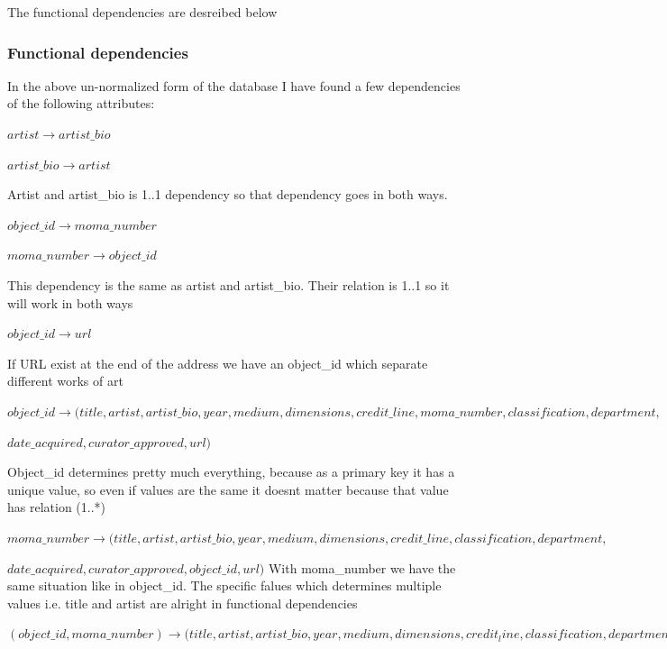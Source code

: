 \documentclass[journal,transmag]{IEEEtran}
\begin{document}
The functional dependencies are desreibed below
\newline


\subsubsection {Functional dependencies}

In the above un-normalized form of the database I have found a few dependencies of the following  attributes:
 
$artist \rightarrow artist\_bio$

$artist\_bio \rightarrow artist$

Artist and artist\_bio is 1..1 dependency so that dependency goes in both ways.
\newline


$object\_id \rightarrow moma\_number$

$moma\_number \rightarrow object\_id$

This dependency is the same as artist and artist\_bio. Their relation is 1..1 so it will work in both ways
\newline


$object\_id \rightarrow url$

If URL exist at the end of the address we have an object\_id which separate different works of art
\newline

$object\_id \rightarrow (title, artist, artist\_bio, year, medium, dimensions, credit\_line, moma\_number, classification, department,$

$date\_acquired, curator\_approved, url)$

Object\_id determines pretty much everything, because as a primary key it has a unique value, so even if values are the same it doesnt matter because that value has relation (1..*) 
\newline

$moma\_number \rightarrow (title, artist, artist\_bio, year, medium, dimensions, credit\_line, classification, department,$ 

$date\_acquired, curator\_approved, object\_id, url)$
With moma\_number we have the same situation like in object\_id. The specific falues which determines multiple values i.e. title and artist are alright in functional dependencies
\newline

$(object\_id, moma\_number) \rightarrow (title, artist, artist\_bio, year, medium, dimensions, credit_line, classification, department,$
\end{document}
